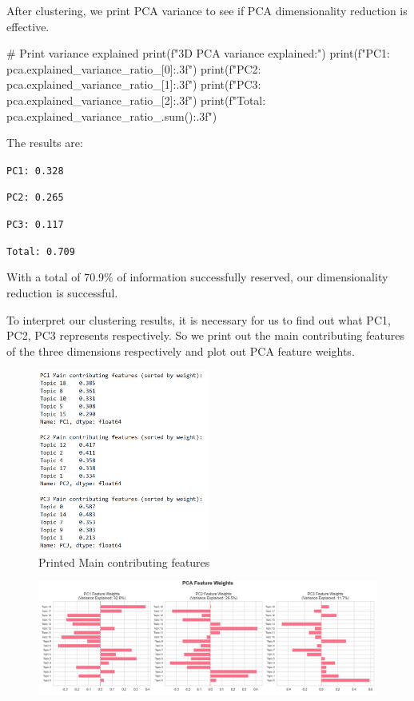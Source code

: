 \documentclass[12pt]{article}
\numberwithin{figure}{section}  %
\begin{document}
	After clustering, we print PCA variance to see if PCA dimensionality
	reduction is effective.
	\begin{python}
# Print variance explained
print(f"3D PCA variance explained:")
print(f"PC1: {pca.explained_variance_ratio_[0]:.3f}")
print(f"PC2: {pca.explained_variance_ratio_[1]:.3f}")  
print(f"PC3: {pca.explained_variance_ratio_[2]:.3f}")
print(f"Total: {pca.explained_variance_ratio_.sum():.3f}")
	\end{python}
	
	The results are:
	
	\texttt{PC1: 0.328}
	
	\texttt{PC2: 0.265}
	
	\texttt{PC3: 0.117}
	
	\texttt{Total: 0.709}
	
	With a total of 70.9\% of information successfully reserved, our
	dimensionality reduction is successful.
	
	To interpret our clustering results, it is necessary for us to find out what
	PC1, PC2, PC3 represents respectively. So we print out the main contributing
	features of the three dimensions respectively and plot out PCA feature
	weights.
	\begin{figure}[H]
		\centering
		\includegraphics[width=0.5\textwidth]{Q2PCA1} 
		\caption{\centering Printed Main contributing features}		
	\end{figure}	
	\begin{figure}[H]
			\centering
			\includegraphics[width=1\textwidth]{Q2PCA2} 		
	\end{figure}
	
\end{document}
